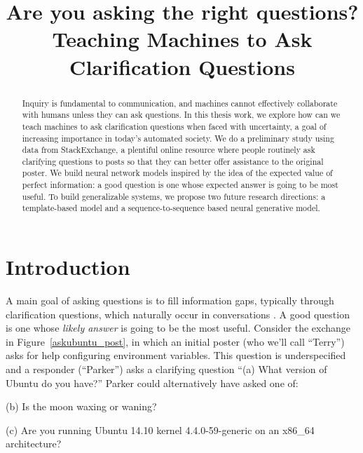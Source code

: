 \documentclass[11pt,a4paper]{article}
\title{Are you asking the right questions? \\ Teaching Machines to Ask Clarification Questions}
\date{}
\begin{document}
\maketitle
\begin{abstract}
	
Inquiry is fundamental to communication, and machines cannot effectively collaborate with humans unless they can ask questions. In this thesis work, we explore how can we teach  machines to ask clarification questions when faced with uncertainty, a goal of increasing importance in today's automated society. We do a preliminary study using data from StackExchange, a plentiful online resource where people routinely ask clarifying questions to posts so that they can better offer assistance to the original poster. We build neural network models inspired by the idea of the expected value of perfect information: a good question is one whose expected answer is going to be most useful. To build generalizable systems, we propose two future research directions: a template-based model and a sequence-to-sequence based neural generative model.
\end{abstract}

\section{Introduction}\label{introduction}

A main goal of asking questions is to fill information gaps, typically through clarification questions, which naturally occur in conversations \cite{purver2004theory,ginzburg2012interactive}. 
A good question is one whose \emph{likely answer} is going to be the most useful.
Consider the exchange in Figure~\ref{askubuntu_post}, in which an initial poster (who we'll call ``Terry'') asks for help configuring environment variables.
This question is underspecified and a responder (``Parker'') asks a clarifying question ``\textsf{\small (a) What version of Ubuntu do you have?}''
Parker could alternatively have asked one of:

\textsf{\small(b) Is the moon waxing or waning?}

\textsf{\small(c) Are you running Ubuntu 14.10 kernel 4.4.0-59-generic on an x86\_64 architecture?}
\end{document}
